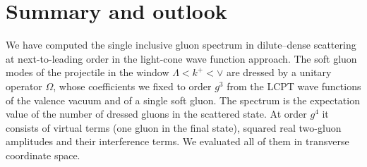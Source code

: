 \section{Summary and outlook}\label{sec:summary}

We have computed the single inclusive gluon spectrum in dilute--dense scattering at next-to-leading order in the light-cone wave function approach. The soft gluon modes of the projectile in the window $\Lambda<k^+<\vee$ are dressed by a unitary operator $\Omega$, whose coefficients we fixed to order $g^3$ from the LCPT wave functions of the valence vacuum and of a single soft gluon. The spectrum is the expectation value of the number of dressed gluons in the scattered state. At order $g^4$ it consists of virtual terms (one gluon in the final state), squared real two-gluon amplitudes and their interference terms. We evaluated all of them in transverse coordinate space.

